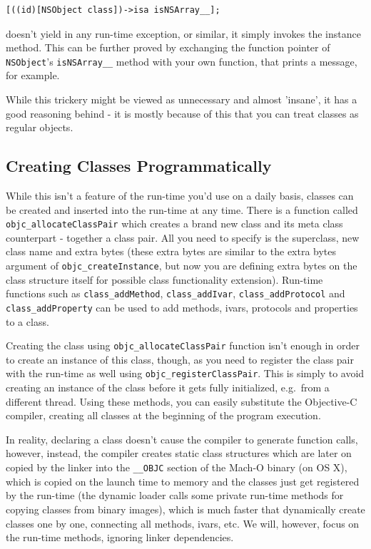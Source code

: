 \begin{verbatim}
[((id)[NSObject class])->isa isNSArray__];
\end{verbatim}

doesn't yield in any run-time exception, or similar, it simply invokes the instance method. This can be further proved by exchanging the function pointer of \verb=NSObject='s \verb=isNSArray__= method with your own function, that prints a message, for example.

While this trickery might be viewed as unnecessary and almost 'insane', it has a good reasoning behind - it is mostly because of this that you can treat classes as regular objects.

\subsection{Creating Classes Programmatically}

While this isn't a feature of the run-time you'd use on a daily basis, classes can be created and inserted into the run-time at any time. There is a function called \verb=objc_allocateClassPair= which creates a brand new class and its meta class counterpart - together a class pair. All you need to specify is the superclass, new class name and extra bytes (these extra bytes are similar to the extra bytes argument of \verb=objc_createInstance=, but now you are defining extra bytes on the class structure itself for possible class functionality extension). Run-time functions such as \verb=class_addMethod=, \verb=class_addIvar=, \verb=class_addProtocol= and \verb=class_addProperty= can be used to add methods, ivars, protocols and properties to a class.

Creating the class using \verb=objc_allocateClassPair= function isn't enough in order to create an instance of this class, though, as you need to register the class pair with the run-time as well using \verb=objc_registerClassPair=. This is simply to avoid creating an instance of the class before it gets fully initialized, e.g.\ from a different thread. Using these methods, you can easily substitute the Objective-C compiler, creating all classes at the beginning of the program execution.

In reality, declaring a class doesn't cause the compiler to generate function calls, however, instead, the compiler creates static class structures which are later on copied by the linker into the \verb=__OBJC= section of the Mach-O binary (on OS X), which is copied on the launch time to memory and the classes just get registered by the run-time (the dynamic loader calls some private run-time methods for copying classes from binary images), which is much faster that dynamically create classes one by one, connecting all methods, ivars, etc. We will, however, focus on the run-time methods, ignoring linker dependencies.

